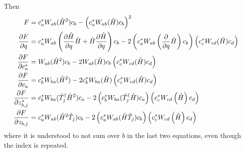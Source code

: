 \documentclass[12pt]{article}
\newcommand{\hc}{^\dagger}
\begin{document}
	Then
	\begin{align}
	F &= c_a^* W_{ab}(\hat{H}^2)c_b - \left(c_a^* W_{ab}(\hat{H})c_b\right)^2\\
	\pdv{F}{q} &= c_a^* W_{ab}\left(\pdv{\hat{H}}{q}\hat{H} + \hat{H}\pdv{\hat{H}}{q}\right)c_b - 2\left(c_a^* W_{ab}\left(\pdv{q}\hat{H}\right)c_b\right)\left(c_c^* W_{cd}(\hat{H})c_d\right)\\
	\pdv{F}{c_a^*} &= W_{ab}(\hat{H}^2)c_b - 2W_{ab}(\hat{H})c_b \left(c_c^*W_{cd}(\hat{H})c_d\right)\\
	\pdv{F}{c_a} &= c_b^*W_{ba}(\hat{H}^2) - 2c_b^*W_{ba}(\hat{H}) \left(c_c^*W_{cd}(\hat{H})c_d\right)\\
	\pdv{F}{z_{b,j}^*} &= c_b^* W_{ba}(\hat{T}_j\hc\hat{H}^2)c_a - 2\left(c_b^* W_{ba}(\hat{T}_j\hc\hat{H})c_a\right)\left(c_c^* W_{cd}\left(\hat{H}\right)c_d\right)\\
	\pdv{F}{z_{b,j}} &= c_a^* W_{ab}(\hat{H}^2\hat{T}_j)c_b - 2\left(c_a^* W_{ab}(\hat{H}\hat{T}_j)c_b\right)\left(c_c^* W_{cd}\left(\hat{H}\right)c_d\right)
	\end{align}
	where it is understood to not sum over $b$ in the last two equations, even though the index is repeated.
	
\end{document}
